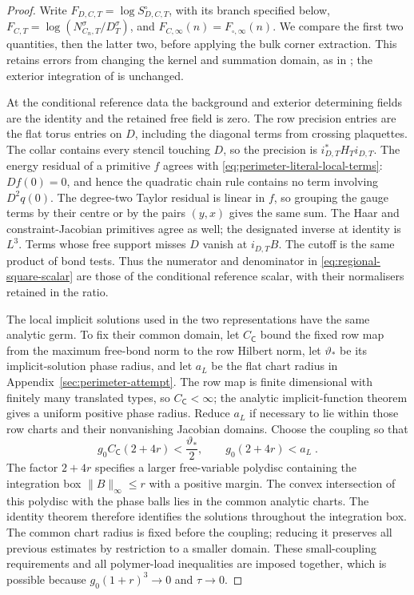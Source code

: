 \documentclass[11pt]{article}
\begin{document}
\begin{proof}
Write $F_{D,C,T}=\log S^\circ_{D,C,T}$, with its branch specified below, $F_{C,T}=\log(N_{C_n,T}^\sigma/D_T^\sigma)$, and $F_{C,\infty}(n)=F_{\square,\infty}(n)$. We compare the first two quantities, then the latter two, before applying the bulk corner extraction. This retains errors from changing the kernel and summation domain, as in \cite[(4.35)--(4.37)]{BalabanRG1}; the exterior integration of \cite[(1.29)--(1.30)]{BalabanCRE} is unchanged.

At the conditional reference data the background and exterior determining fields are the identity and the retained free field is zero. The row precision entries are the flat torus entries on $D$, including the diagonal terms from crossing plaquettes. The collar contains every stencil touching $D$, so the precision is $i_{D,T}^*H_Ti_{D,T}$. The energy residual of a primitive $f$ agrees with \eqref{eq:perimeter-literal-local-terms}: $Df(0)=0$, and hence the quadratic chain rule contains no term involving $D^2q(0)$. The degree-two Taylor residual is linear in $f$, so grouping the gauge terms by their centre or by the pairs $(y,x)$ gives the same sum. The Haar and constraint-Jacobian primitives agree as well; the designated inverse at identity is $L^3$. Terms whose free support misses $D$ vanish at $i_{D,T}B$. The cutoff is the same product of bond tests. Thus the numerator and denominator in \eqref{eq:regional-square-scalar} are those of the conditional reference scalar, with their normalisers retained in the ratio.

The local implicit solutions used in the two representations have the same analytic germ. To fix their common domain, let $C_{\mathsf C}$ bound the fixed row map from the maximum free-bond norm to the row Hilbert norm, let $\vartheta_*$ be its implicit-solution phase radius, and let $a_L$ be the flat chart radius in Appendix~\ref{sec:perimeter-attempt}. The row map is finite dimensional with finitely many translated types, so $C_{\mathsf C}<\infty$; the analytic implicit-function theorem gives a uniform positive phase radius. Reduce $a_L$ if necessary to lie within those row charts and their nonvanishing Jacobian domains. Choose the coupling so that
\begin{equation}
    g_0C_{\mathsf C}(2+4r)<\frac{\vartheta_*}{2},
    \qquad g_0(2+4r)<a_L\;.
\end{equation}
The factor $2+4r$ specifies a larger free-variable polydisc containing the integration box $\|B\|_\infty\leq r$ with a positive margin. The convex intersection of this polydisc with the phase balls lies in the common analytic charts. The identity theorem therefore identifies the solutions throughout the integration box. The common chart radius is fixed before the coupling; reducing it preserves all previous estimates by restriction to a smaller domain. These small-coupling requirements and all polymer-load inequalities are imposed together, which is possible because $g_0(1+r)^3\to0$ and $\tau\to0$.


\end{proof}
\end{document}
